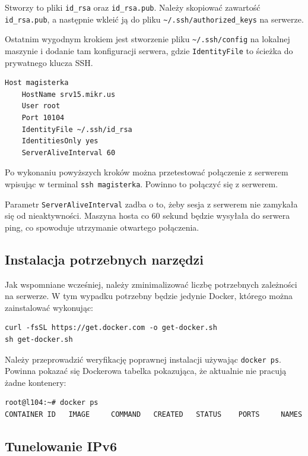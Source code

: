\documentclass{article}
\begin{document}
Stworzy to pliki \lstinline|id_rsa| oraz \lstinline|id_rsa.pub|. Należy skopiować zawartość \lstinline|id_rsa.pub|, a następnie wkleić ją do pliku \lstinline|~/.ssh/authorized_keys| na serwerze.

Ostatnim wygodnym krokiem jest stworzenie pliku \lstinline|~/.ssh/config| na lokalnej maszynie i dodanie tam konfiguracji serwera, gdzie \lstinline|IdentityFile| to ścieżka do prywatnego klucza SSH.

\begin{lstlisting}[caption=Przykładowa konfiguracja pliku config na lokalnej maszynie]
Host magisterka
    HostName srv15.mikr.us
    User root
    Port 10104
    IdentityFile ~/.ssh/id_rsa
    IdentitiesOnly yes
    ServerAliveInterval 60
\end{lstlisting}

Po wykonaniu powyższych kroków można przetestować połączenie z serwerem wpisując w terminal \lstinline|ssh magisterka|. Powinno to połączyć się z serwerem.

Parametr \lstinline|ServerAliveInterval| zadba o to, żeby sesja z serwerem nie zamykała się od nieaktywności. Maszyna hosta co 60 sekund będzie wysyłała do serwera ping, co spowoduje utrzymanie otwartego połączenia.


\subsection{Instalacja potrzebnych narzędzi}

Jak wspomniane wcześniej, należy zminimalizować liczbę potrzebnych zależności na serwerze. W tym wypadku potrzebny będzie jedynie Docker, którego można zainstalować wykonując:

\begin{lstlisting}[caption=Skrypt instalujący dockera na maszynie Ubuntu]
curl -fsSL https://get.docker.com -o get-docker.sh
sh get-docker.sh
\end{lstlisting}

Należy przeprowadzić weryfikację poprawnej instalacji używając \lstinline|docker ps|. Powinna pokazać się Dockerowa tabelka pokazująca, że aktualnie nie pracują żadne kontenery:

\begin{lstlisting}[caption=Wynik wykonania komendy weryfikującej instalację Dockera]
root@l104:~# docker ps
CONTAINER ID   IMAGE     COMMAND   CREATED   STATUS    PORTS     NAMES
\end{lstlisting}


\subsection{Tunelowanie IPv6}
\end{document}
